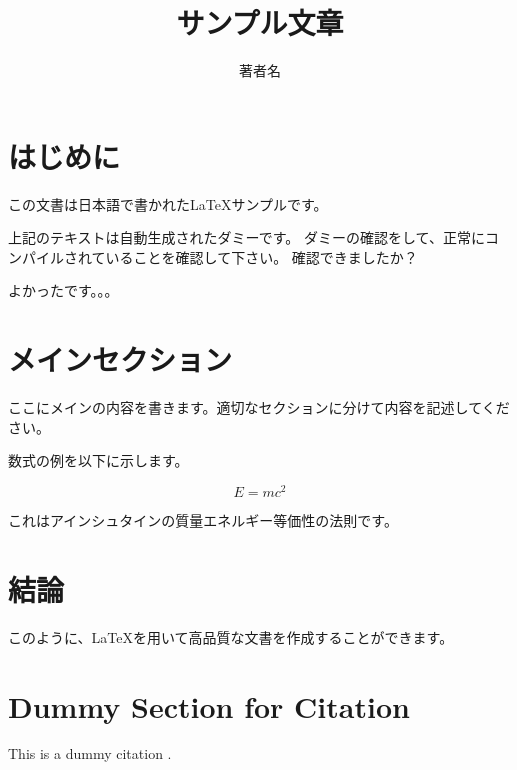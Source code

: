 \documentclass[uplatex,11pt]{jsarticle}
\title{サンプル文章}
\author{著者名}
\begin{document}
\maketitle

\section{はじめに}
この文書は日本語で書かれたLaTeXサンプルです。

\lipsum[1] %

上記のテキストは自動生成されたダミーです。
ダミーの確認をして、正常にコンパイルされていることを確認して下さい。
確認できましたか？

よかったです。。。

\section{メインセクション}
ここにメインの内容を書きます。適切なセクションに分けて内容を記述してください。


数式の例を以下に示します。

\begin{equation}
E = mc^2
\end{equation}

これはアインシュタインの質量エネルギー等価性の法則です。

\section{結論}
このように、LaTeXを用いて高品質な文書を作成することができます。
\section*{Dummy Section for Citation}
This is a dummy citation \cite{dummy2023}.

% 
% 
\end{document}
